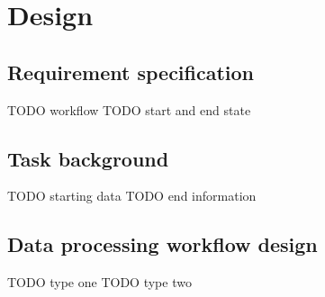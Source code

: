 \chapter{Design}
\section{Requirement specification}


TODO workflow
TODO start and end state

\section{Task background}

TODO starting data
TODO end information

\section{Data processing workflow design}

TODO type one
TODO type two

